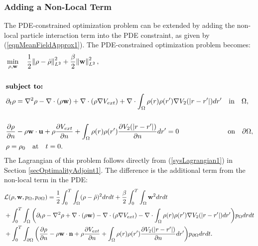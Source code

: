 \subsubsection{Adding a Non-Local Term}\label{secOptimalitySysNonLocal1}	
The PDE-constrained optimization problem can be extended by adding the non-local particle interaction term into the PDE constraint, as given by (\ref{eqnMeanFieldApprox1}).
The PDE-constrained optimization problem becomes:
\begin{align}\label{sysPDEconstroptiAndNonlocal1}
&\min_{\rho,\mathbf{w}} \quad \frac{1}{2}\norm{\rho- \hat{\rho}}_{L^2}^2 + \frac{\beta}{2} \norm{\mathbf{w}}_{L^2}^2,\\
\notag\\
&\textbf{subject to:}\notag\\ 
&\partial_t \rho = \nabla^2 \rho - \nabla \cdot (\rho \mathbf{w}) + \nabla \cdot (\rho \nabla V_{ext}) + \nabla \cdot \int_\Omega \rho(r) \rho(r') \nabla V_2(|r-r'|) dr' \quad \text{in} \quad \Omega,\notag\\
\notag\\
&\dfrac{\partial \rho}{\partial n} - \rho \mathbf{w} \cdot \mathbf{u} + \rho \dfrac{\partial V_{ext}}{\partial n} +\int_\Omega \rho(r) \rho(r') \frac{\partial V_2(|r-r'|)}{\partial n} dr'  =0 \quad\quad \quad \quad \quad \quad \quad \text{on} \quad \partial \Omega,\notag \\
& \rho = \rho_0 \quad \text{at} \quad t=0.  \notag
\end{align}
The Lagrangian of this problem follows directly from (\ref{sysLagrangian1}) in Section \ref{secOptimalityAdjoint1}. The difference is the additional term from the non-local term in the PDE:
\begin{align}\label{sysLagrangianNonLocal1} 
&\mathcal{L}(\rho,\mathbf{w}, p_\Omega, p_{\partial \Omega}) = \frac{1}{2}\int_0^T\int_\Omega  (\rho- \hat{\rho})^2 dr dt  + \frac{\beta}{2} \int_0^T \int_\Omega \mathbf{w}^2 dr dt \\
&+ \int_0^T \int_\Omega \bigg( \partial_t \rho - \nabla^2 \rho + \nabla \cdot (\rho \mathbf{w}) - \nabla \cdot (\rho \nabla V_{ext}) \notag - \nabla \cdot \int_\Omega \rho(r) \rho(r') \nabla V_2(|r-r'|) dr'\bigg) p_\Omega dr dt \notag \\ 
&+\int_0^T  \int_{\partial \Omega}  \bigg(\dfrac{\partial \rho}{\partial n} - \rho \mathbf{w} \cdot \mathbf{n} + \rho \dfrac{\partial V_{ext}}{\partial n}+\int_\Omega \rho(r) \rho(r') \frac{\partial V_2(|r-r'|)}{\partial n} dr'\bigg) p_{\partial \Omega} dr dt  \notag.
\end{align}
